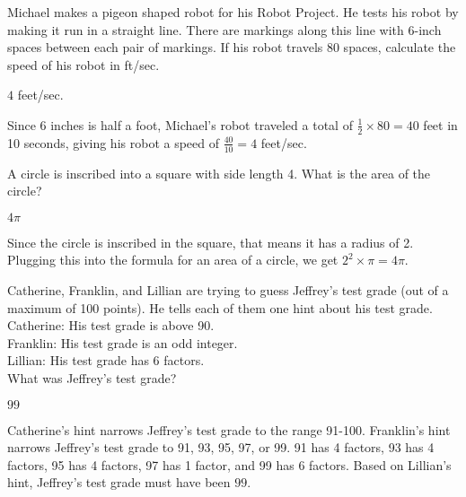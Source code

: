 \documentclass[11pt]{article}
\begin{document}
\begin{problem} Michael makes a pigeon shaped robot for his Robot Project. He tests his robot by making it run in a straight line. There are markings along this line with 6-inch spaces between each pair of markings. If his robot travels 80 spaces, calculate the speed of his robot in ft/sec.
\end{problem}
\begin{answer}
$\boxed{4}$ feet/sec.
\end{answer}
\begin{solution} Since 6 inches is half a foot, Michael's robot traveled a total of $\frac{1}{2} \times 80 = 40$ feet in 10 seconds, giving his robot a speed of $\frac{40}{10} = \boxed{4}$ feet/sec.
\end{solution}

\begin{problem}
A circle is inscribed into a square with side length 4. What is the area of the circle?
\end{problem}
\begin{answer}
$\boxed{4\pi}$
\end{answer}
\begin{solution}
Since the circle is inscribed in the square, that means it has a radius of 2. Plugging this into the formula for an area of a circle, we get $2^2\times\pi = \boxed{4\pi}$.
\end{solution}

\begin{problem} 
Catherine, Franklin, and Lillian are trying to guess Jeffrey's test grade (out of a maximum of 100 points). He tells each of them one hint about his test grade.
\\Catherine: His test grade is above 90.
\\Franklin: His test grade is an odd integer.
\\Lillian: His test grade has 6 factors.
\\What was Jeffrey's test grade?
\end{problem}
\begin{answer}
$\boxed{99}$
\end{answer}
\begin{solution} Catherine's hint narrows Jeffrey's test grade to the range 91-100. Franklin's hint narrows Jeffrey's test grade to 91, 93, 95, 97, or 99. 91 has 4 factors, 93 has 4 factors, 95 has 4 factors, 97 has 1 factor, and 99 has 6 factors. Based on Lillian's hint, Jeffrey's test grade must have been $\boxed{99}$.
\end{solution}
\end{document}

